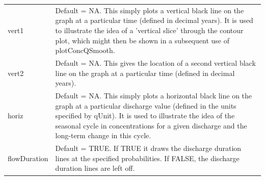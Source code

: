 \documentclass[a4paper,11pt]{article}\usepackage{graphicx, color}
\begin{document}
\begin{table}[ht]
\begin{tabularx}{\textwidth}{lX}
vert1 & Default = NA.  This simply plots a vertical black line on the graph at a particular time (defined in decimal years).  It is used to illustrate the idea of a 'vertical slice' through the contour plot, which might then be shown in a subsequent use of plotConcQSmooth.  \\
vert2 & Default = NA.  This gives the location of a second vertical black line on the graph at a particular time (defined in decimal years). \\
horiz & Default = NA.  This simply plots a horizontal black line on the graph at a particular discharge value (defined in the units specified by qUnit).  It is used to illustrate the idea of the seasonal cycle in concentrations for a given discharge and the long-term change in this cycle.  \\
flowDuration & Default = TRUE.  If TRUE it draws the discharge duration lines at the specified probabilities.  If FALSE, the discharge duration lines are left off.\\
\hline
\end{tabularx}

\end{table}
\end{document}
